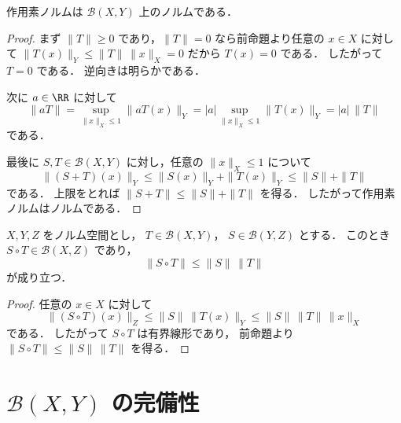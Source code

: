 \begin{proposition}
作用素ノルムは $\mathcal B(X,Y)$ 上のノルムである．
\end{proposition}
\begin{proof}
まず $\|T\|\ge 0$ であり，$\|T\|=0$ なら前命題より任意の $x\in X$ に対して
$\|T(x)\|_Y\le \|T\|\,\|x\|_X=0$ だから $T(x)=0$ である．
したがって $T=0$ である．
逆向きは明らかである．

次に $a\in\RR$ に対して
\[
\|aT\|
=
\sup_{\|x\|_X\le 1}\|aT(x)\|_Y
=
|a|\sup_{\|x\|_X\le 1}\|T(x)\|_Y
=
|a|\,\|T\|
\]
である．

最後に $S,T\in\mathcal B(X,Y)$ に対し，任意の $\|x\|_X\le 1$ について
\[
\|(S+T)(x)\|_Y
\le
\|S(x)\|_Y+\|T(x)\|_Y
\le
\|S\|+\|T\|
\]
である．
上限をとれば
$\|S+T\|\le \|S\|+\|T\|$ を得る．
したがって作用素ノルムはノルムである．
\end{proof}

\begin{proposition}[合成に関する評価]
$X,Y,Z$ をノルム空間とし，
$T\in\mathcal B(X,Y)$，
$S\in\mathcal B(Y,Z)$ とする．
このとき
$S\circ T\in\mathcal B(X,Z)$ であり，
\[
\|S\circ T\|\le \|S\|\,\|T\|
\]
が成り立つ．
\end{proposition}
\begin{proof}
任意の $x\in X$ に対して
\[
\|(S\circ T)(x)\|_Z
\le
\|S\|\,\|T(x)\|_Y
\le
\|S\|\,\|T\|\,\|x\|_X
\]
である．
したがって $S\circ T$ は有界線形であり，
前命題より
$\|S\circ T\|\le \|S\|\,\|T\|$ を得る．
\end{proof}

\section{\texorpdfstring{$\mathcal B(X,Y)$}{B(X,Y)} の完備性}

